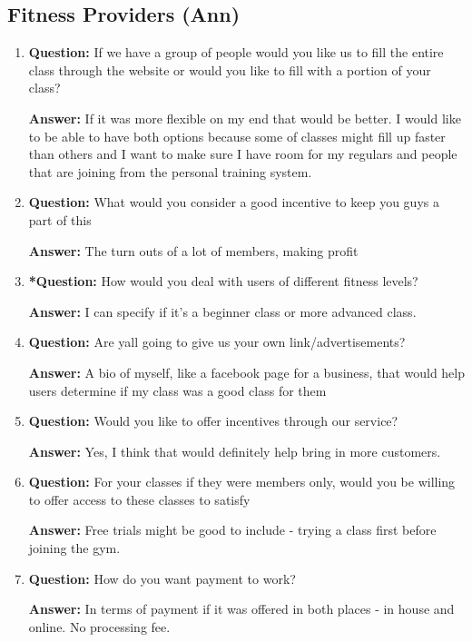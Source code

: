 \documentclass[12pt]{article}
\begin{document}
\subsection{Fitness Providers (Ann)}
\begin{enumerate}
\item \textbf{Question:}  If we have a group of people would you like us to fill the entire class through the website or would you like to fill with a portion of your class?

\textbf{Answer:}  If it was more flexible on my end that would be better. I would like to be able to have both options because some of classes might fill up faster than others and I want to make sure I have room for my regulars and people that are joining from the personal training system. 

\item \textbf{Question:}  What would you consider a good incentive to keep you guys a part of this

\textbf{Answer:}  The turn outs of a lot of members, making profit

\item \textbf{*Question:} How would you deal with users of different fitness levels? 

\textbf{Answer:}  I can specify if it’s a beginner class or more advanced class.

\item \textbf{Question:}  Are yall going to give us your own link/advertisements? 

\textbf{Answer:}  A bio of myself, like a facebook page for a business, that would help users determine if my class was a good class for them

\item \textbf{Question:}  Would you like to offer incentives through our service?

\textbf{Answer:}  Yes, I think that would definitely help bring in more customers.

\item \textbf{Question:}  For your classes if they were members only, would you be willing to offer access to these classes to satisfy

\textbf{Answer:}  Free trials might be good to include - trying a class first before joining the gym.

\item \textbf{Question:} How do you want payment to work?

\textbf{Answer:}  In terms of payment if it was offered in both places - in house and online.  No processing fee. 


\end{enumerate}
\end{document}
